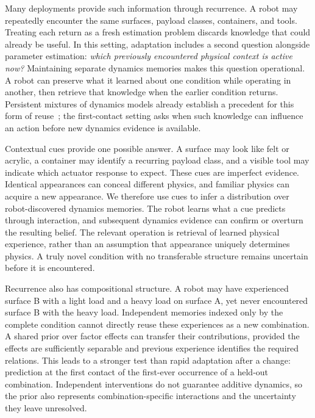 Many deployments provide such information through recurrence. A robot may repeatedly encounter the same surfaces, payload classes, containers, and tools. Treating each return as a fresh estimation problem discards knowledge that could already be useful. In this setting, adaptation includes a second question alongside parameter estimation: \emph{which previously encountered physical context is active now?} Maintaining separate dynamics memories makes this question operational. A robot can preserve what it learned about one condition while operating in another, then retrieve that knowledge when the earlier condition returns. Persistent mixtures of dynamics models already establish a precedent for this form of reuse~\cite{nagabandi2019mole}; the first-contact setting asks when such knowledge can influence an action before new dynamics evidence is available.

Contextual cues provide one possible answer. A surface may look like felt or acrylic, a container may identify a recurring payload class, and a visible tool may indicate which actuator response to expect. These cues are imperfect evidence. Identical appearances can conceal different physics, and familiar physics can acquire a new appearance. We therefore use cues to infer a distribution over robot-discovered dynamics memories. The robot learns what a cue predicts through interaction, and subsequent dynamics evidence can confirm or overturn the resulting belief. The relevant operation is retrieval of learned physical experience, rather than an assumption that appearance uniquely determines physics. A truly novel condition with no transferable structure remains uncertain before it is encountered.

Recurrence also has compositional structure. A robot may have experienced surface B with a light load and a heavy load on surface A, yet never encountered surface B with the heavy load. Independent memories indexed only by the complete condition cannot directly reuse these experiences as a new combination. A shared prior over factor effects can transfer their contributions, provided the effects are sufficiently separable and previous experience identifies the required relations. This leads to a stronger test than rapid adaptation after a change: prediction at the first contact of the first-ever occurrence of a held-out combination. Independent interventions do not guarantee additive dynamics, so the prior also represents combination-specific interactions and the uncertainty they leave unresolved.

